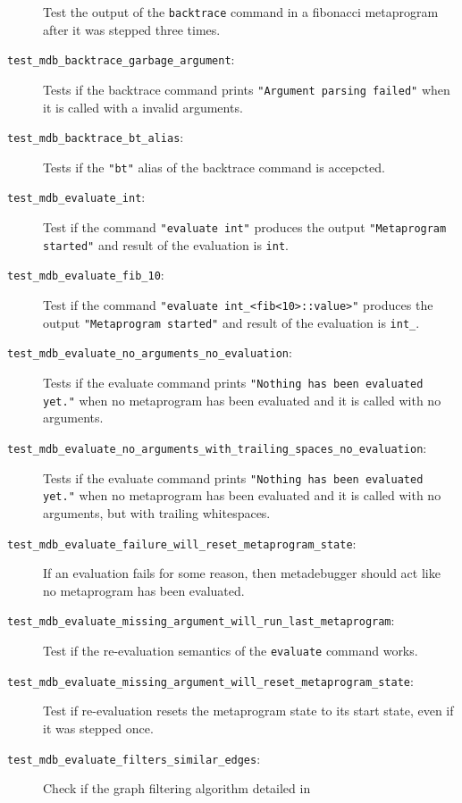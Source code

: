 \begin{description}
        Test the output of the \texttt{backtrace} command in a fibonacci
        metaprogram after it was stepped three times.
    \item[\texttt{test\_mdb\_backtrace\_garbage\_argument}:]
        Tests if the backtrace command prints
        \texttt{"Argument parsing failed"} when it is called with a invalid
        arguments.
    \item[\texttt{test\_mdb\_backtrace\_bt\_alias}:]
        Tests if the \texttt{"bt"} alias of the backtrace command is
        accepcted.
    \item[\texttt{test\_mdb\_evaluate\_int}:]
        Test if the command \texttt{"evaluate int"} produces the output
        \texttt{"Metaprogram started"} and result of the evaluation is
        \texttt{int}.
    \item[\texttt{test\_mdb\_evaluate\_fib\_10}:]
        Test if the command \texttt{"evaluate int\_<fib<10>::value>"} produces
        the output \texttt{"Metaprogram started"} and result of the evaluation
        is \texttt{int\_<55>}.
    \item[\texttt{test\_mdb\_evaluate\_no\_arguments\_no\_evaluation}:]
        Tests if the evaluate command prints
        \texttt{"Nothing has been evaluated yet."} when no metaprogram has been
        evaluated and it is called with no arguments.
    \item[\texttt{test\_mdb\_evaluate\_no\_arguments\_with\_trailing\_spaces\_no\_evaluation}:]
        Tests if the evaluate command prints
        \texttt{"Nothing has been evaluated yet."} when no metaprogram has been
        evaluated and it is called with no arguments, but with trailing
        whitespaces.
    \item[\texttt{test\_mdb\_evaluate\_failure\_will\_reset\_metaprogram\_state}:]
        If an evaluation fails for some reason, then metadebugger should act
        like no metaprogram has been evaluated.
    \item[\texttt{test\_mdb\_evaluate\_missing\_argument\_will\_run\_last\_metaprogram}:]
        Test if the re-evaluation semantics of the \texttt{evaluate} command
        works.
    \item[\texttt{test\_mdb\_evaluate\_missing\_argument\_will\_reset\_metaprogram\_state}:]
        Test if re-evaluation resets the metaprogram state to its start state,
        even if it was stepped once.
    \item[\texttt{test\_mdb\_evaluate\_filters\_similar\_edges}:]
        Check if the graph filtering algorithm detailed in

\end{description}
